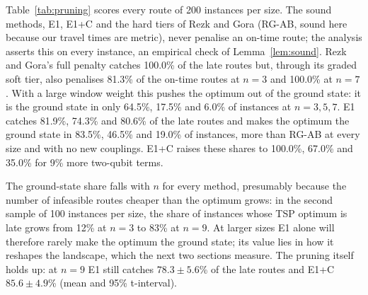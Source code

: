 Table~\ref{tab:pruning} scores every route of 200 instances per size. The sound methods, E1,
E1+C and the hard tiers of Rezk and Gora (RG-AB, sound here because our travel times are
metric), never penalise an on-time route; the analysis asserts this on every instance, an
empirical check of Lemma~\ref{lem:sound}. Rezk and Gora's full penalty catches 100.0\% of the late
routes but, through its graded soft tier, also penalises 81.3\% of the on-time routes at $n=3$
and 100.0\% at $n=7$. With a large window weight this pushes the optimum out of the ground state:
it is the ground state in only 64.5\%, 17.5\% and 6.0\% of instances at $n=3,5,7$. E1 catches
81.9\%, 74.3\% and 80.6\% of the late routes and makes the optimum the ground state in 83.5\%,
46.5\% and 19.0\% of instances, more than RG-AB at every size and with no new couplings. E1+C
raises these shares to 100.0\%, 67.0\% and 35.0\% for 9\% more two-qubit terms.

The ground-state share falls with $n$ for every method, presumably because the number of
infeasible routes cheaper than the optimum grows: in the second sample of 100 instances per
size, the share of instances whose TSP optimum is late grows from 12\% at $n=3$ to 83\% at
$n=9$. At larger sizes E1 alone will therefore rarely make the optimum the ground state; its
value lies in how it reshapes the landscape, which the next two sections measure. The pruning
itself holds up: at $n=9$ E1 still catches $78.3\pm5.6$\% of the late routes and E1+C
$85.6\pm4.9$\% (mean and 95\% t-interval).

